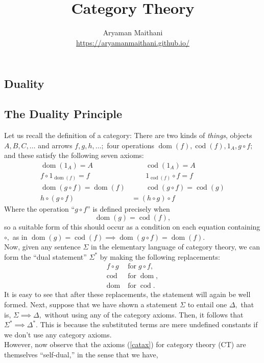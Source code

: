 \documentclass[11pt,leqno,landscape,semhelv]{seminar}
\title{\vspace{1cm} Category Theory}
\author{Aryaman Maithani\\\url{https://aryamanmaithani.github.io/}}
\date{\DTMnow}
\theoremstyle{definition}
\numberwithin{joke}{section}
\numberwithin{thm}{section}
\numberwithin{equation}{section}
\renewcommand{\sec}[1]{%
\begin{slide}
\begin{center}
    \begin{center}
        \section{#1}
    \end{center}
\end{center}
\end{slide}}
\newcommand{\cod}{\operatorname{cod}}
\newcommand{\dom}{\operatorname{dom}}
\begin{document}
\maketitle
\newpage
\setcounter{section}{-2}
\tableofcontents




\sec{Duality}
\subsection{The Duality Principle}
Let us recall the definition of a category: There are two kinds of \emph{things}, objects $A, B, C,\ldots$ and arrows $f, g, h, \ldots;$ four operations $\dom(f), \cod(f), 1_A, g \circ f;$ and these satisfy the following seven axioms:
\begin{align} 
  \dom(1_A) = A &\qquad \cod(1_A) = A\nonumber\\
  f\circ1_{\dom(f)} = f &\qquad 1_{\cod(f)}\circ f = f \label{catax}\\
  \dom(g\circ f) = \dom(f) &\qquad \cod(g\circ f) = \cod(g)\nonumber\\
  h\circ(g\circ f) &= (h\circ g) \circ f\nonumber
\end{align}
Where the operation ``$g\circ f$'' is defined precisely when
\begin{equation*} 
  \dom(g) = \cod(f),
\end{equation*}
so a suitable form of this should occur as a condition on each equation containing $\circ,$ as in $\dom(g) = \cod(f) \implies \dom(g\circ f) = \dom(f).$\\
Now, given any sentence $\Sigma$ in the elementary language of category theory, we can form the ``dual statement'' $\Sigma^*$ by making the following replacements:
\begin{align*} 
  f\circ g \; &\text{for} \; g \circ f,\\
  \cod \; &\text{for} \; \dom,\\
  \dom \; &\text{for} \; \cod.
\end{align*}
It is easy to see that after these replacements, the statement will again be well formed. Next, suppose that we have shown a statement $\Sigma$ to entail one $\Delta,$ that is, $\Sigma \implies \Delta,$ without using any of the category axioms. Then, it follows that $\Sigma^* \implies \Delta^*.$ This is because the substituted terms are mere undefined constants if we don't use any category axioms.\\
However, now observe that the axioms (\ref{catax}) for category theory (CT) are themselves ``self-dual,'' in the sense that we have,
\end{document}
